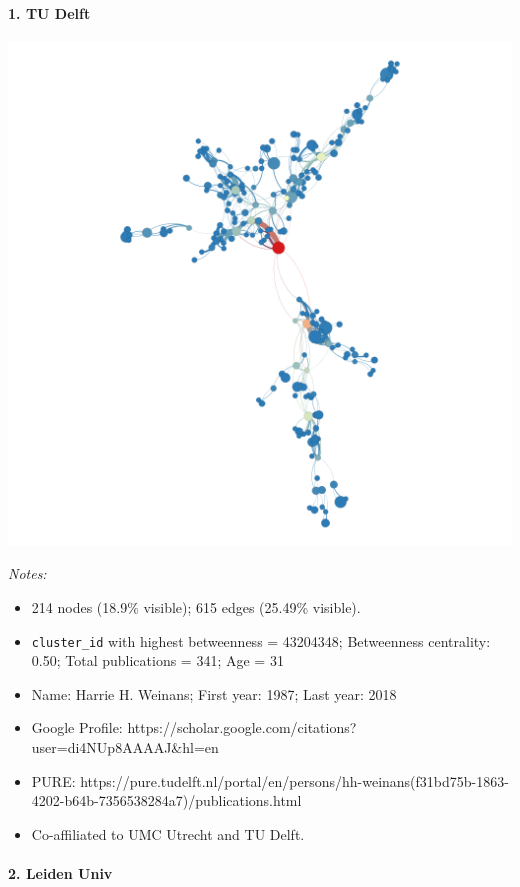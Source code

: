 \documentclass[]{elsarticle} %
\makeatletter
\providecommand{\tightlist}{%
  \setlength{\itemsep}{0pt}\setlength{\parskip}{0pt}}
\def\maxwidth{\ifdim\Gin@nat@width>\linewidth\linewidth
\else\Gin@nat@width\fi}
\let\Oldincludegraphics\includegraphics
\renewcommand{\includegraphics}[1]{\Oldincludegraphics[width=\maxwidth]{#1}}
\makeatother
\begin{document}
\hypertarget{tu-delft-1}{%
\paragraph{1. TU Delft}\label{tu-delft-1}}

\includegraphics{figs/tu_bio_betweenness.png}

\emph{Notes:}

\begin{itemize}
\tightlist
\item
  214 nodes (18.9\% visible); 615 edges (25.49\% visible).
\item
  \texttt{cluster\_id} with highest betweenness = 43204348; Betweenness
  centrality: 0.50; Total publications = 341; Age = 31
\item
  Name: Harrie H. Weinans; First year: 1987; Last year: 2018
\item
  Google Profile:
  https://scholar.google.com/citations?user=di4NUp8AAAAJ\&hl=en
\item
  PURE:
  https://pure.tudelft.nl/portal/en/persons/hh-weinans(f31bd75b-1863-4202-b64b-7356538284a7)/publications.html
\item
  Co-affiliated to UMC Utrecht and TU Delft.
\end{itemize}

\hypertarget{leiden-univ-1}{%
\paragraph{2. Leiden Univ}\label{leiden-univ-1}}
\end{document}
